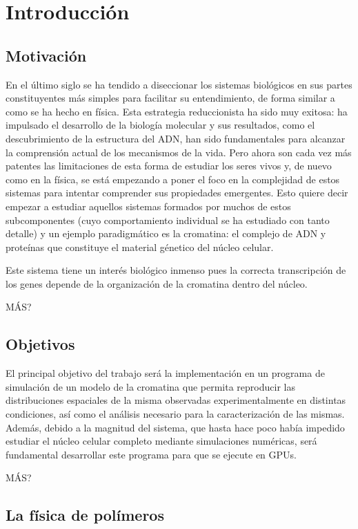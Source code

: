 \chapter{Introducción}
\label{cap:introduction}

\section{Motivación}

En el último siglo se ha tendido a diseccionar los sistemas biológicos en sus partes constituyentes más simples para facilitar su entendimiento, de forma similar a como se ha hecho en física. Esta estrategia reduccionista ha sido muy exitosa: ha impulsado el desarrollo de la biología molecular y sus resultados, como el descubrimiento de la estructura del ADN, han sido fundamentales para alcanzar la comprensión actual de los mecanismos de la vida. Pero ahora son cada vez más patentes las limitaciones de esta forma de estudiar los seres vivos y, de nuevo como en la física, se está empezando a poner el foco en la complejidad de estos sistemas para intentar comprender sus propiedades emergentes. Esto quiere decir empezar a estudiar aquellos sistemas formados por muchos de estos subcomponentes (cuyo comportamiento individual se ha estudiado con tanto detalle) y un ejemplo paradigmático es la cromatina: el complejo de ADN y proteínas que constituye el material génetico del núcleo celular.

Este sistema tiene un interés biológico inmenso pues la correcta transcripción de los genes depende de la organización de la cromatina dentro del núcleo.

MÁS?

\section{Objetivos}

El principal objetivo del trabajo será la implementación en un programa de simulación de un modelo de la cromatina que permita reproducir las distribuciones espaciales de la misma observadas experimentalmente en distintas condiciones, así como el análisis necesario para la caracterización de las mismas. Además, debido a la magnitud del sistema, que hasta hace poco había impedido estudiar el núcleo celular completo mediante simulaciones numéricas, será fundamental desarrollar este programa para que se ejecute en GPUs.

MÁS?

\section{La física de polímeros}

